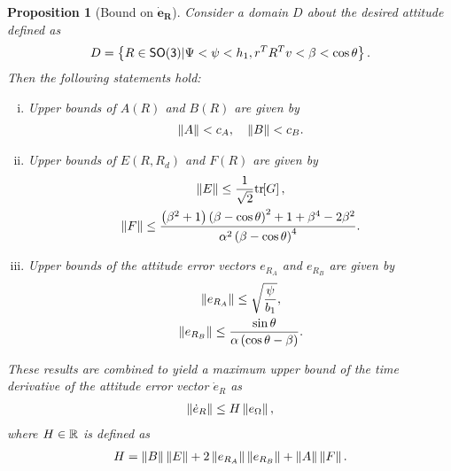 \documentclass[letterpaper, 10 pt, conference]{ieeeconf}  %
\newtheorem{prop}{Proposition}
\begin{document}
\begin{prop}[Bound on \( \bm{\dot{e}_R} \)]\label{prop:eR_dot_bound}
Consider a domain \( D \) about the desired attitude defined as
\begin{align}
	D = \left\{ R \in \mathsf{SO(3)} \vert \Psi < \psi < h_1, r^T R^T v < \beta < \cos \theta \right\}. \label{eqn:domain}
\end{align}
Then the following statements hold:
\begin{enumerate}[(i)]
	\item \label{item:prop_eR_dot_bound_AB} Upper bounds of \( A(R) \) and \( B(R) \) are given by
	\begin{gather}
		\left\| A \right\| < c_A  , \quad \left\| B \right\| < c_B . \label{eqn:AB_bound}
	\end{gather}
	\item \label{item:prop_eR_dot_bound_EF} Upper bounds of \( E(R,R_d) \) and \( F(R) \) are given by
	\begin{gather}
		\left\| E \right\| \leq \frac{1}{\sqrt{2}} \mathrm{tr}\negthickspace\left[ G \right]  , \label{eqn:E_bound} \\
		\left\| F \right\| \leq \frac{\left( \beta^2 + 1 \right)\left( \beta - \cos \theta \right)^2 + 1 + \beta^4-2 \beta^2}{\alpha^2 \left( \beta-\cos \theta \right)^4} . \label{eqn:F_bound}
	\end{gather}
	\item Upper bounds of the attitude error vectors \( e_{R_A} \) and \( e_{R_B} \) are given by
	\begin{gather}
		\left\| e_{R_A} \right\| \leq \sqrt{\frac{\psi}{b_1}}, \label{eqn:eRA_bound} \\
		\left\| e_{R_B} \right\| \leq \frac{\sin\theta}{\alpha \left( \cos \theta - \beta \right)}. \label{eqn:eRB_bound}
	\end{gather}
\end{enumerate}
These results are combined to yield a maximum upper bound of the time derivative of the attitude error vector \( \dot{e}_R \) as
\begin{gather}
	\left\| \dot{e}_R \right\| \leq H \left\| e_\Omega \right\| ,\label{eqn:eR_bound}
\end{gather}
where  \( H \in \mathbb{R} \) is defined as
\begin{gather}
	H = \left\| B \right\| \left\| E \right\| + 2 \left\| e_{R_A} \right\| \left\| e_{R_B} \right\| + \left\| A \right\|\left\| F \right\|. \label{eqn:H}
\end{gather}
\end{prop}
\end{document}
